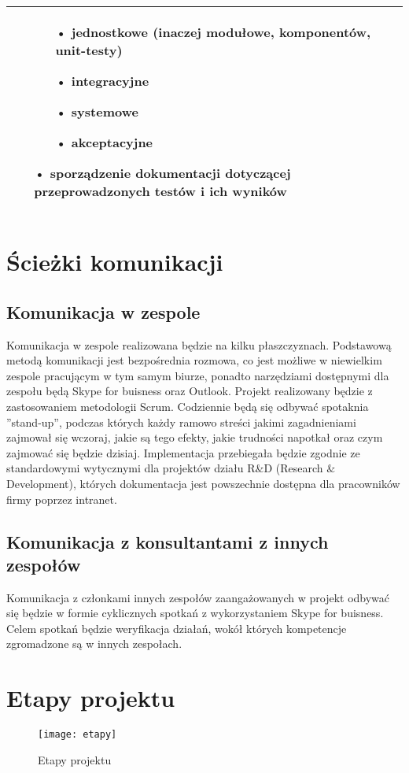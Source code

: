 \begin{center}
\begin{tabular}{ | l | p{5cm} | p{5cm} |}
\begin{itemize}
\begin{itemize}
	\item[•] jednostkowe (inaczej modułowe, komponentów, unit-testy)
	\item[•] integracyjne
	\item[•] systemowe
	\item[•] akceptacyjne
	\end{itemize}
	\item[•] sporządzenie dokumentacji dotyczącej przeprowadzonych testów i ich wyników
	\end{itemize}
	\\ \hline
    \hline
    \end{tabular}
\end{center}

\chapter{Ścieżki komunikacji}
\section{Komunikacja w zespole}
Komunikacja w zespole realizowana będzie na kilku płaszczyznach. Podstawową metodą komunikacji jest bezpośrednia rozmowa, co jest możliwe w niewielkim zespole pracującym w tym samym biurze, ponadto narzędziami dostępnymi dla zespołu będą Skype for buisness oraz Outlook. Projekt realizowany będzie z zastosowaniem metodologii Scrum. Codziennie będą się odbywać spotaknia ''stand-up'', podczas których każdy ramowo streści jakimi zagadnieniami zajmował się wczoraj, jakie są tego efekty, jakie trudności napotkał oraz czym zajmować się będzie dzisiaj. Implementacja przebiegała będzie zgodnie ze standardowymi wytycznymi dla projektów działu R$\&$D (Research $\&$ Development), których dokumentacja jest powszechnie dostępna dla pracowników firmy poprzez intranet.
\section{Komunikacja z konsultantami z innych zespołów}
Komunikacja z członkami innych zespołów zaangażowanych w projekt odbywać się będzie w formie cyklicznych spotkań z wykorzystaniem Skype for buisness. Celem spotkań będzie weryfikacja działań, wokół których kompetencje zgromadzone są w innych zespołach.
\chapter{Etapy projektu}
\begin{figure}[H]
\centering
  \texttt{[image: etapy]}
  \caption{Etapy projektu}
  \label{etapy}
\end{figure}

